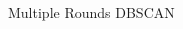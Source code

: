 \documentclass{article}
\begin{document}
\begin{CJK}{UTF8}{gbsn}
\begin{figure} [htb]
\begin{minipage}[c]{0.5\textwidth}
		\vfill
		\hspace{0.01\linewidth}
		
		\caption{Multiple Rounds DBSCAN}
		\label{fig:subfig}
	\end{minipage} 
\end{figure}




\end{CJK}
\end{document}

